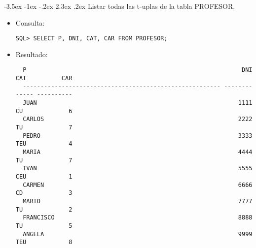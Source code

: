 \documentclass[11pt]{report}
\makeatletter
\renewcommand\chapter{\@startsection{chapter}{0}{\z@}%
    {-3.5ex \@plus -1ex \@minus -.2ex}%
    {2.3ex \@plus.2ex}%
    {\normalfont\Large\bfseries}}
\makeatother
\begin{document}
\chapter{Listar todas las t-uplas de la tabla PROFESOR.}
\begin{itemize}
  \item Consulta:
  \begin{verbatim}
SQL> SELECT P, DNI, CAT, CAR FROM PROFESOR;
  \end{verbatim}
  \item{Resultado:}
  \begin{verbatim}
  P                                                             DNI CAT          CAR                                                                                                                
  -------------------------------------------------------- -------- ----- ----------                                                                                                                
  JUAN                                                         1111 CU             6                                                                                                                
  CARLOS                                                       2222 TU             7                                                                                                                
  PEDRO                                                        3333 TEU            4                                                                                                                
  MARIA                                                        4444 TU             7                                                                                                                
  IVAN                                                         5555 CEU            1                                                                                                                
  CARMEN                                                       6666 CD             3                                                                                                                
  MARIO                                                        7777 TU             2                                                                                                                
  FRANCISCO                                                    8888 TU             5                                                                                                                
  ANGELA                                                       9999 TEU            8                                                                                                                

\end{verbatim}
\end{itemize}
\end{document}
